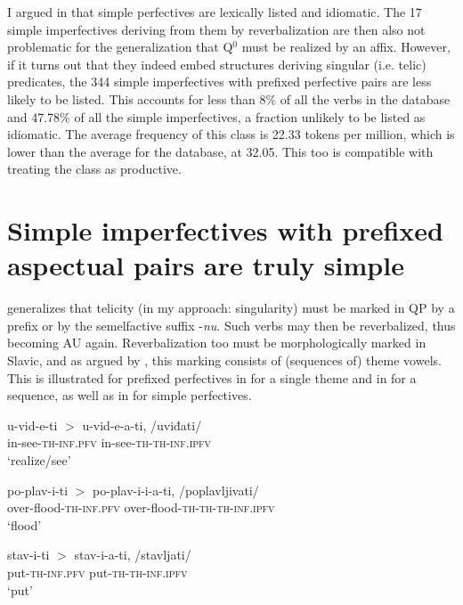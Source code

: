 \documentclass[output=paper]{langscibook}
\begin{document}
I argued in  that simple perfectives are lexically listed and idiomatic. The 17 simple imperfectives deriving from them by reverbalization are then also not problematic for the generalization that Q$^0$ must be realized by an affix. However, if it turns out that they indeed embed structures deriving singular (i.e. telic) predicates, the 344 simple imperfectives with prefixed perfective pairs are less likely to be listed. This accounts for less than 8\% of all the verbs in the database and 47.78\% of all the simple imperfectives, a fraction unlikely to be listed as idiomatic. The average frequency of this class is 22.33 tokens per million, which is lower than the average for the database, at 32.05. This too is compatible with treating the class as productive.

\section{Simple imperfectives with prefixed aspectual pairs are truly simple}\label{ars:sec:Simple}

\citet{Lazor.2010} generalizes that telicity (in my approach: singularity) must be marked in QP by a prefix or by the semelfactive suffix -\textit{nu}. Such verbs may then be reverbalized, thus becoming AU again. Reverbalization too must be morphologically marked in Slavic, and as argued by \citet{SimMilAr2021}, this marking consists of (sequences of) theme vowels. This is illustrated for prefixed perfectives in  for a single theme and in  for a sequence, as well as in  for simple perfectives.

\ea\label{ars:ex:reverbaliza}
	\begin{xlist} 
		
	    \ex  \gll u-vid-e-ti $>$ {u-vid-e-a-ti, /uviđati/}\\ 
                  in-see-\textsc{th-inf.pfv} {} in-see-\textsc{th-th-inf.ipfv} \\ 
            \glt `realize/see' \label{ars:ex:reverbalizaa}
            
        \ex  \gll po-plav-i-ti $>$ {po-plav-i-i-a-ti,  /poplavljivati/}\\ 
                  over-flood-\textsc{th-inf.pfv} {} over-flood-\textsc{th-th-th-inf.ipfv} \\ 
            \glt `flood' \label{ars:ex:reverbalizab}
            
        \ex  \gll stav-i-ti $>$ {stav-i-a-ti, /stavljati/}\\ 
                  put-\textsc{th-inf.pfv} {} put-\textsc{th-th-inf.ipfv}\\ 
            \glt `put' \label{ars:ex:reverbalizac}

	\end{xlist}
\z
\end{document}
